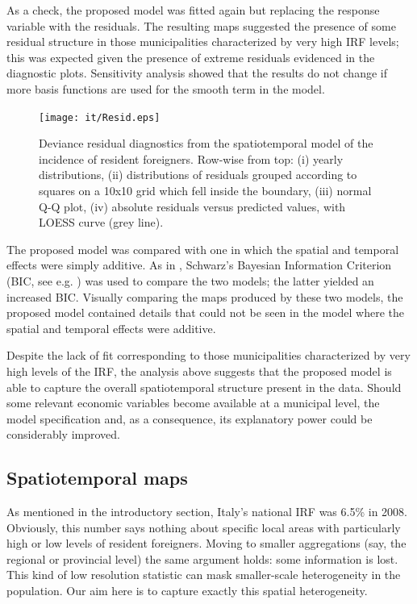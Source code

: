 As a check, the proposed model was fitted again but replacing the response variable with the residuals. The resulting maps suggested the presence of some residual structure in those municipalities characterized by very high IRF levels; this was expected given the presence of extreme residuals evidenced in the diagnostic plots. Sensitivity analysis showed that the results do not change if more basis functions are used for the smooth term in the model. 

\begin{figure}[tbp]
	\centering
		\texttt{[image: it/Resid.eps]}
	\caption{Deviance residual diagnostics from the spatiotemporal model of the incidence of resident foreigners. Row-wise from top: (i) yearly distributions, (ii) distributions of residuals grouped according to squares on a 10x10 grid which fell inside the boundary, (iii) normal Q-Q plot, (iv) absolute residuals versus predicted values, with LOESS curve (grey line).}
	\label{Resid}
\end{figure}

The proposed model was compared with one in which the spatial and temporal effects were simply additive. As in , Schwarz's Bayesian Information Criterion (BIC, see e.g. \cite[p. 286]{burnhamanderson}) was used to compare the two models; the latter yielded an increased BIC. Visually comparing the maps produced by these two models, the proposed model contained details that could not be seen in the model where the spatial and temporal effects were additive.

Despite the lack of fit corresponding to those municipalities characterized by very high levels of the IRF, the analysis above suggests that the proposed model is able to capture the overall spatiotemporal structure present in the data. Should some relevant economic variables become available at a municipal level, the model specification and, as a consequence, its explanatory power could be considerably improved. 

\subsection{Spatiotemporal maps \label{STT}}

As mentioned in the introductory section, Italy's national IRF was 6.5\% in 2008. Obviously, this number says nothing about specific local areas with particularly high or low levels of resident foreigners. Moving to smaller aggregations (say, the regional or provincial level) the same argument holds: some information is lost. This kind of low resolution statistic can mask smaller-scale heterogeneity in the population. Our aim here is to capture exactly this spatial heterogeneity.

